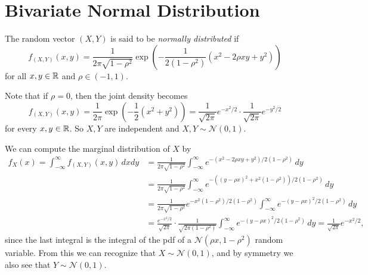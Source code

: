 \section{Bivariate Normal Distribution}

\begin{definition}
  The random vector $(X, Y)$ is said to be
  \emph{normally distributed} if
  \[
    f_{(X, Y)}(x, y) = \frac{1}{2\pi \sqrt{1 - \rho^2}}
    \exp\left(-\frac{1}{2(1 - \rho^2)} (x^2 - 2\rho xy + y^2)\right)
  \]
  for all $x, y \in \mathbb{R}$ and $\rho \in (-1, 1)$.
\end{definition}

\begin{remark}
  Note that if $\rho = 0$, then the joint density
  becomes
  \[
    f_{(X, Y)}(x, y) = \frac{1}{2\pi} \exp\left(-\frac{1}{2}(x^2 + y^2)\right)
    = \frac{1}{\sqrt{2\pi}} e^{-x^2 / 2}
    \cdot \frac{1}{\sqrt{2\pi}} e^{-y^2 / 2}
  \]
  for every $x, y \in \mathbb{R}$. So $X, Y$ are
  independent and $X, Y \sim \mathcal{N}(0, 1)$.
\end{remark}

\begin{example}
  We can compute the marginal distribution of $X$ by
  \begin{align*}
    f_X(x)
    = \int_{-\infty}^\infty f_{(X, Y)}(x, y)\, dxdy
    &= \frac{1}{2\pi \sqrt{1 - \rho^2}} \int_{-\infty}^\infty e^{-(x^2 - 2\rho xy + y^2) / 2(1 - \rho^2)} \, dy \\
    &= \frac{1}{2\pi\sqrt{1 - \rho^2}} \int_{-\infty}^\infty e^{-((y - \rho x)^2 + x^2(1 - \rho^2)) / 2 (1 - \rho^2)}\, dy \\
    &= \frac{1}{2\pi\sqrt{1 - \rho^2}} e^{-x^2(1 - \rho^2) / 2(1 - \rho^2)} \int_{-\infty}^\infty e^{-(y - \rho x)^2 / 2 (1 - \rho^2)}\, dy \\
    &= \frac{e^{-x^2 / 2}}{\sqrt{2\pi}} \cdot \frac{1}{\sqrt{2\pi(1 - \rho^2)}} \int_{-\infty}^\infty e^{-(y - \rho x)^2 / 2(1 - \rho^2)}\, dy
    = \frac{1}{\sqrt{2\pi}} e^{-x^2 / 2},
  \end{align*}
  since the last integral is the integral of the pdf
  of a $\mathcal{N}(\rho x, 1 - \rho^2)$ random
  variable. From this we can recognize that
  $X \sim \mathcal{N}(0, 1)$, and by symmetry
  we also see that $Y \sim \mathcal{N}(0, 1)$.
\end{example}

